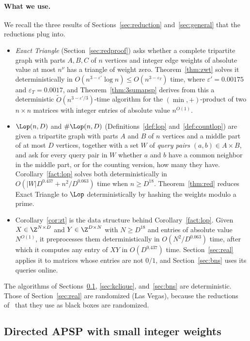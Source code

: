 \paragraph{What we use.}
We recall the three results of Sections~\ref{sec:reduction} and~\ref{sec:general} that the reductions plug into.
\begin{itemize}
\item \emph{Exact Triangle} (Section~\ref{sec:redproof}) asks whether a complete tripartite graph with parts $A,B,C$ of $n$ vertices and integer edge weights of absolute value at most $n^\nu$ has a triangle of weight zero. Theorem~\ref{thm:zwt} solves it deterministically in $O(n^{3-\varepsilon'}\log n)\leq O(n^{3-\varepsilon_T})$ time, where $\varepsilon'=0.00175$ and $\varepsilon_T=0.0017$, and Theorem~\ref{thm:3sumapsp} derives from this a deterministic $\tilde{O}(n^{3-\varepsilon'/3})$-time algorithm for the $(\min,+)$-product of two $n\times n$ matrices with integer entries of absolute value $n^{O(1)}$.
\item $\Lop(n,D)$ and $\#\Lop(n,D)$ (Definitions~\ref{def:lop} and~\ref{def:countlop}) are given a tripartite graph with parts $A$ and $B$ of $n$ vertices and a middle part of at most $D$ vertices, together with a set $W$ of \emph{query pairs} $(a,b)\in A\times B$, and ask for every query pair in $W$ whether $a$ and $b$ have a common neighbor in the middle part, or for the counting version, how many they have. Corollary~\ref{fact:lop} solves both deterministically in $O(|W|D^{0.437}+n^2/D^{0.063})$ time when $n\ge D^{18}$. Theorem~\ref{thm:red} reduces Exact Triangle to $\Lop$ deterministically by hashing the weights modulo a prime.
\item Corollary~\ref{cor:zt} is the data structure behind Corollary~\ref{fact:lop}. Given $X\in\Z^{N\times D}$ and $Y\in\Z^{D\times N}$ with $N\ge D^{18}$ and entries of absolute value $N^{O(1)}$, it preprocesses them deterministically in $O(N^2/D^{0.063})$ time, after which it computes any entry of $XY$ in $O(D^{0.437})$ time. Section~\ref{sec:real} applies it to matrices whose entries are not $0/1$, and Section~\ref{sec:bns} uses its queries online.
\end{itemize}
{The algorithms of Sections~\ref{sec:dirapsp}, \ref{sec:kclique}, and~\ref{sec:bns} are deterministic. Those of Section~\ref{sec:real} are randomized (Las Vegas), because the reductions of~\cite{CVX22} that they use as black boxes are randomized.}

\subsection{Directed APSP with small integer weights}\label{sec:dirapsp}

